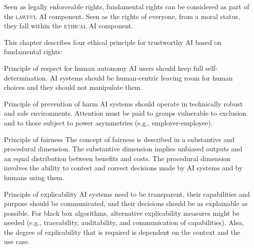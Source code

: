 \begin{remark}
    Seen as legally enforceable rights, fundamental rights can be considered as part of the \textsc{lawful} AI component. Seen as the rights of everyone, from a moral status, they fall within the \textsc{ethical} AI component.
\end{remark}

This chapter describes four ethical principle for trustworthy AI based on fundamental rights:
\begin{descriptionlist}
    \item[Principle of respect for human autonomy] 
        AI users should keep full self-determination. AI systems should be human-centric leaving room for human choices and they should not manipulate them.

    
    \item[Principle of prevention of harm] 
        AI systems should operate in technically robust and safe environments. Attention must be paid to groups vulnerable to exclusion and to those subject to power asymmetries (e.g., employer-employee).


    \item[Principle of fairness] 
        The concept of fairness is described in a substantive and procedural dimension. The substantive dimension implies unbiased outputs and an equal distribution between benefits and costs. The procedural dimension involves the ability to contest and correct decisions made by AI systems and by humans using them.


    \item[Principle of explicability] 
        AI systems need to be transparent, their capabilities and purpose should be communicated, and their decisions should be as explainable as possible. For black box algorithms, alternative explicability measures might be needed (e.g., traceability, auditability, and communication of capabilities). Also, the degree of explicability that is required is dependent on the context and the use case.
\end{descriptionlist}

